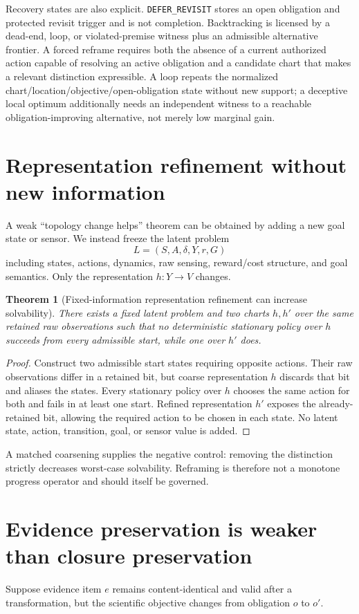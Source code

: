\documentclass[11pt]{article}
\newtheorem{theorem}{Theorem}
\begin{document}
Recovery states are also explicit. \texttt{DEFER\_REVISIT} stores an open
obligation and protected revisit trigger and is not completion. Backtracking is
licensed by a dead-end, loop, or violated-premise witness plus an admissible
alternative frontier. A forced reframe requires both the absence of a current
authorized action capable of resolving an active obligation and a candidate
chart that makes a relevant distinction expressible. A loop repeats the
normalized chart\slash location\slash objective\slash open-obligation state without new support;
a deceptive local optimum additionally needs an independent witness to a
reachable obligation-improving alternative, not merely low marginal gain.

\section{Representation refinement without new information}
A weak ``topology change helps'' theorem can be obtained by adding a new goal state or sensor. We instead freeze the latent problem
\[
L=(S,A,\delta,Y,r,G)
\]
including states, actions, dynamics, raw sensing, reward/cost structure, and goal semantics. Only the representation $h:Y\to V$ changes.

\begin{theorem}[Fixed-information representation refinement can increase solvability]
There exists a fixed latent problem and two charts $h,h'$ over the same retained raw observations such that no deterministic stationary policy over $h$ succeeds from every admissible start, while one over $h'$ does.
\end{theorem}
\begin{proof}
Construct two admissible start states requiring opposite actions. Their raw observations differ in a retained bit, but coarse representation $h$ discards that bit and aliases the states. Every stationary policy over $h$ chooses the same action for both and fails in at least one start. Refined representation $h'$ exposes the already-retained bit, allowing the required action to be chosen in each state. No latent state, action, transition, goal, or sensor value is added.
\end{proof}

A matched coarsening supplies the negative control: removing the distinction strictly decreases worst-case solvability. Reframing is therefore not a monotone progress operator and should itself be governed.

\section{Evidence preservation is weaker than closure preservation}
Suppose evidence item $e$ remains content-identical and valid after a transformation, but the scientific objective changes from obligation $o$ to $o'$.
\end{document}
